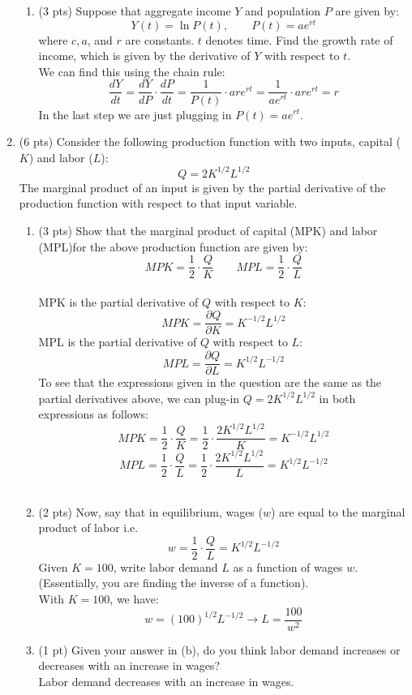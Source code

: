 \documentclass{./../../Latex/tests}
\begin{document}
\begin{enumerate}
\begin{enumerate}
\item (3 pts) Suppose that aggregate income $Y$ and population $P$ are given by:
$$Y(t) = \ln P(t), \quad \quad P(t) = ae^{rt}$$ 
where $c, a$, and $r$ are constants. $t$ denotes time. Find the growth rate of income, which is given by the derivative of $Y$ with respect to $t$. \\

We can find this using the chain rule:
$$ \frac{dY}{dt} =  \frac{dY}{dP} \cdot \frac{dP}{dt} = \frac{1}{P(t)}\cdot are^{rt}= \frac{1}{ae^{rt}}\cdot are^{rt} = r $$
In the last step we are just plugging in $P(t) = ae^{rt}$.
\end{enumerate}


\item (6 pts) Consider the following production function with two inputs, capital ($K$) and labor ($L$):
$$ Q = 2K^{1/2}L^{1/2} $$
The marginal product of an input is given by the partial derivative of the production function with respect to that input variable. 
\begin{enumerate}
\item (3 pts) Show that the marginal product of capital (MPK) and labor (MPL)for the above production function are given by:
$$ MPK = \frac{1}{2}\cdot\frac{Q}{K} \quad \quad MPL = \frac{1}{2}\cdot \frac{Q}{L} $$ \\
MPK is the partial derivative of $Q$ with respect to $K$:
$$ MPK = \frac{\partial Q}{\partial K} = K^{-1/2} L^{1/2}  $$
MPL is the partial derivative of $Q$ with respect to $L$:
$$ MPL = \frac{\partial Q}{\partial L} = K^{1/2} L^{-1/2} $$
To see that the expressions given in the question are the same as the partial derivatives above, we can plug-in $Q=2K^{1/2}L^{1/2}$ in both expressions as follows:
$$ MPK = \frac{1}{2}\cdot\frac{Q}{K}=  \frac{1}{2}\cdot\frac{2K^{1/2}L^{1/2}}{K} =  K^{-1/2} L^{1/2} $$
$$ MPL = \frac{1}{2}\cdot\frac{Q}{L} = \frac{1}{2}\cdot\frac{2K^{1/2}L^{1/2}}{L} =  K^{1/2} L^{-1/2} $$ \\

\item (2 pts) Now, say that in equilibrium, wages ($w$) are equal to the marginal product of labor i.e.
$$ w = \frac{1}{2}\cdot \frac{Q}{L} = K^{1/2}L^{-1/2}   $$
Given $K=100$, write labor demand $L$ as a function of wages $w$. (Essentially, you are finding the inverse of a function). \\

With $K=100$, we have:
$$ w = (100)^{1/2} L^{-1/2} \rightarrow  L = \frac{100}{w^2}$$ 

\item (1 pt) Given your answer in (b), do you think labor demand increases or decreases with an increase in wages? \\
Labor demand decreases with an increase in wages.
\end{enumerate}


\end{enumerate}
\end{document}
